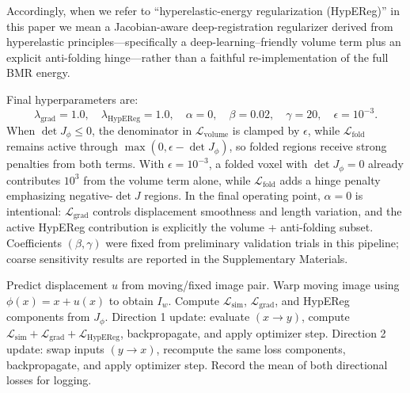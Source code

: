 \documentclass[jimaging,article,submit,pdftex,moreauthors]{Definitions/mdpi}
\begin{document}
Accordingly, when we refer to ``hyperelastic-energy regularization (HypEReg)'' in this paper we mean a Jacobian-aware deep-registration regularizer derived from hyperelastic principles---specifically a deep-learning--friendly volume term plus an explicit anti-folding hinge---rather than a faithful re-implementation of the full BMR energy.

Final hyperparameters are:
\[
\lambda_{\mathrm{grad}} = 1.0, \quad
\lambda_{\mathrm{HypEReg}} = 1.0, \quad
\alpha = 0, \quad
\beta = 0.02, \quad
\gamma = 20, \quad
\epsilon = 10^{-3}.
\]
When \(\det J_\phi \le 0\), the denominator in \(\mathcal{L}_{\mathrm{volume}}\) is clamped by \(\epsilon\), while \(\mathcal{L}_{\mathrm{fold}}\) remains active through \(\max(0,\epsilon-\det J_\phi)\), so folded regions receive strong penalties from both terms. With \(\epsilon=10^{-3}\), a folded voxel with \(\det J_\phi=0\) already contributes \(10^3\) from the volume term alone, while \(\mathcal{L}_{\mathrm{fold}}\) adds a hinge penalty emphasizing negative-\(\det J\) regions. In the final operating point, \(\alpha=0\) is intentional: \(\mathcal{L}_{\mathrm{grad}}\) controls displacement smoothness and length variation, and the active HypEReg contribution is explicitly the volume + anti-folding subset. Coefficients \((\beta,\gamma)\) were fixed from preliminary validation trials in this pipeline; coarse sensitivity results are reported in the Supplementary Materials.

\begin{algorithm}[H]
\caption{HypEReg-TransMorph training step (per mini-batch)}
\begin{algorithmic}[1]
\State Predict displacement $u$ from moving/fixed image pair.
\State Warp moving image using $\phi(x)=x+u(x)$ to obtain $I_w$.
\State Compute $\mathcal{L}_{\mathrm{sim}}$, $\mathcal{L}_{\mathrm{grad}}$, and HypEReg components from $J_\phi$.
\State Direction 1 update: evaluate $(x\rightarrow y)$, compute $\mathcal{L}_{\mathrm{sim}}+\mathcal{L}_{\mathrm{grad}}+\mathcal{L}_{\mathrm{HypEReg}}$, backpropagate, and apply optimizer step.
\State Direction 2 update: swap inputs $(y\rightarrow x)$, recompute the same loss components, backpropagate, and apply optimizer step.
\State Record the mean of both directional losses for logging.
\end{algorithmic}
\end{algorithm}
\end{document}
